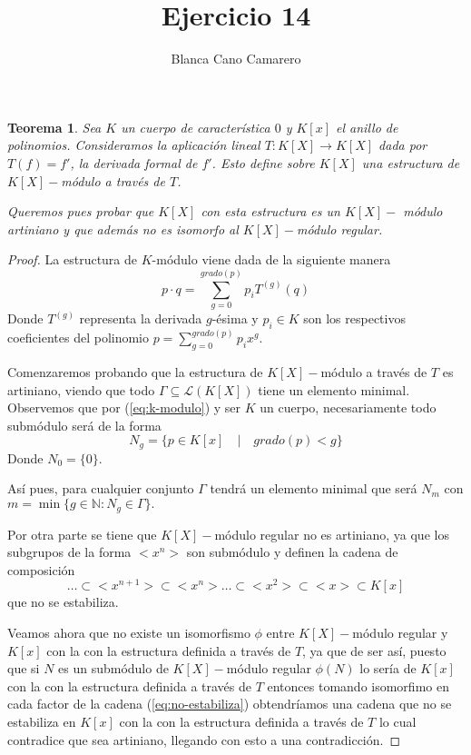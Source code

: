 \documentclass{article}
\title{Ejercicio 14}
\author{Blanca Cano Camarero}
\newtheorem*{teorema*}{Teorema}
\newcommand{\N}{\mathbb{N}}
\begin{document}
\maketitle

\begin{teorema*}
    Sea $K$ un cuerpo de característica $0$ y $K[x]$ el anillo de polinomios. Consideramos la aplicación lineal $T: K[X] \longrightarrow K[X]$ 
    dada por $T(f) = f'$, 
    la derivada formal de $f'$.
    Esto define sobre $K[X]$ una estructura de $K[X]-$módulo a través de $T$. 

    Queremos pues probar que $K[X]$ con esta estructura es un $K[X]-$ módulo artiniano y que además no es isomorfo al $K[X]-$módulo regular.
\end{teorema*}   

\begin{proof}

    La estructura de $K$-módulo viene dada de la siguiente manera 
    \begin{equation}\label{eq:k-modulo}
        p \cdot q = \sum^{grado(p)}_{g = 0} p_i T^{(g)}(q)
    \end{equation}
    Donde $T^{(g)}$ representa la derivada $g$-ésima y $p_i \in K$ son los respectivos coeficientes del polinomio $p = \sum^{grado(p)}_{g = 0} p_i x^g$. 

    Comenzaremos probando que la estructura de $K[X]-$módulo a través de $T$ es artiniano, viendo que todo 
    $\Gamma \subseteq \mathcal{L}(K[X])$ tiene un elemento minimal.
    Observemos que por (\ref{eq:k-modulo}) y ser $K$ un cuerpo, necesariamente todo submódulo será de la forma 
    \begin{equation}
        N_g = 
        \{
            p \in K[x] \quad |  \quad grado(p) < g
        \}
    \end{equation}
    Donde $N_0 = \{0\}$. 

    Así pues, para cualquier conjunto $\Gamma$ tendrá un elemento minimal que será $N_m$ con $m = \min\{ g \in \N : N_g \in \Gamma\}.$


    Por otra parte se tiene que 
    $K[X]-$módulo regular no es artiniano, ya que los subgrupos de la forma 
    $<x^n>$ son submódulo y definen la cadena de composición 
    \begin{equation} \label{eq:no-estabiliza}
        \ldots \subset <x^{n+1}>
        \subset <x^{n}>
        \ldots 
        \subset <x^{2}>
        \subset <x>
        \subset K[x]
    \end{equation}
    que no se estabiliza. 

    Veamos ahora que no existe un isomorfismo $\phi$ entre  $K[X]-$módulo regular 
    y $K[x]$ con la con la estructura definida a través de $T$, ya que de ser así, puesto que si $N$ es un submódulo de 
    $K[X]-$módulo regular $\phi(N)$ lo sería de  $K[x]$ con la con la estructura definida a través de $T$ 
    entonces tomando isomorfimo en cada factor de la cadena (\ref{eq:no-estabiliza}) obtendríamos una cadena que no se estabiliza en $K[x]$ con la con la estructura definida a través de $T$ lo cual contradice que sea artiniano, llegando con esto a una contradicción.


\end{proof}
\end{document}
